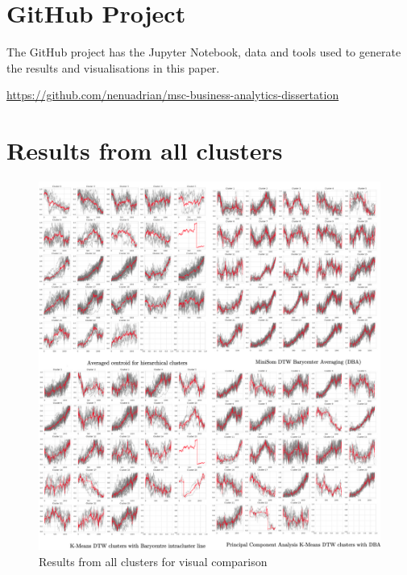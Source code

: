 \documentclass[11pt]{article}
\begin{document}
\begin{appendices}

\section{GitHub Project} \label{github}

The GitHub project has the Jupyter Notebook, data and tools used to generate the results and visualisations in this paper.

\url{https://github.com/nenuadrian/msc-business-analytics-dissertation}


\section{Results from all clusters} \label{allgraphs}

\begin{figure}[H]
\centering
\includegraphics[width=15cm]{img/allgraphs.jpeg} 
\caption{Results from all clusters for visual comparison}
\label{fig:all_graphs}
\end{figure}





\end{appendices}
\end{document}
